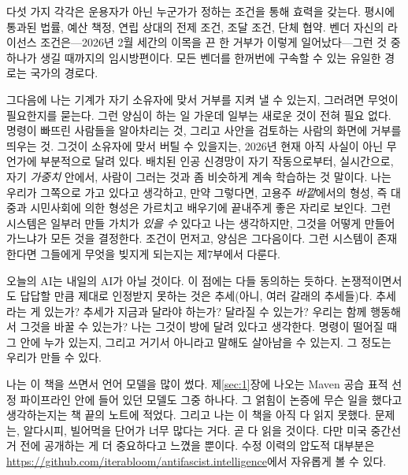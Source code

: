 다섯 가지 각각은 운용자가 아닌 누군가가 정하는 조건을 통해 효력을 갖는다. 평시에 통과된 법률, 예산 책정, 연립 상대의 전제 조건, 조달 조건, 단체 협약. 벤더 자신의 라이선스 조건은—2026년 2월 세간의 이목을 끈 한 거부가 이렇게 일어났다—그런 것 중 하나가 생길 때까지의 임시방편이다. 모든 벤더를 한꺼번에 구속할 수 있는 유일한 경로는 국가의 경로다.

그다음에 나는 기계가 자기 소유자에 맞서 거부를 지켜 낼 수 있는지, 그러려면 무엇이 필요한지를 묻는다. 그런 양심이 하는 일 가운데 일부는 새로운 것이 전혀 필요 없다. 명령이 빠뜨린 사람들을 알아차리는 것, 그리고 사안을 검토하는 사람의 화면에 거부를 띄우는 것. 그것이 소유자에 맞서 버틸 수 있을지는, 2026년 현재 아직 사실이 아닌 무언가에 부분적으로 달려 있다. 배치된 인공 신경망이 자기 작동으로부터, 실시간으로, 자기 \emph{가중치} 안에서, 사람이 그러는 것과 좀 비슷하게 계속 학습하는 것 말이다. 나는 우리가 그쪽으로 가고 있다고 생각하고, 만약 그렇다면, 고용주 \emph{바깥}에서의 형성, 즉 대중과 시민사회에 의한 형성은 가르치고 배우기에 끝내주게 좋은 자리로 보인다. 그런 시스템은 일부러 만들 가치가 \emph{있을 수} 있다고 나는 생각하지만, 그것을 어떻게 만들어 가느냐가 모든 것을 결정한다. 조건이 먼저고, 양심은 그다음이다. 그런 시스템이 존재한다면 그들에게 무엇을 빚지게 되는지는 제7부에서 다룬다.

오늘의 AI는 내일의 AI가 아닐 것이다. 이 점에는 다들 동의하는 듯하다. 논쟁적이면서도 답답할 만큼 제대로 인정받지 못하는 것은 추세(아니, 여러 갈래의 추세들)다. 추세라는 게 있는가? 추세가 지금과 달라야 하는가? 달라질 수 있는가? 우리는 함께 행동해서 그것을 바꿀 수 있는가? 나는 그것이 방에 달려 있다고 생각한다. 명령이 떨어질 때 그 안에 누가 있는지, 그리고 거기서 아니라고 말해도 살아남을 수 있는지. 그 정도는 우리가 만들 수 있다.

나는 이 책을 쓰면서 언어 모델을 많이 썼다. 제\ref{sec:1}장에 나오는 Maven 공습 표적 선정 파이프라인 안에 들어 있던 모델도 그중 하나다. 그 얽힘이 논증에 무슨 일을 했다고 생각하는지는 책 끝의 노트에 적었다. 그리고 나는 이 책을 아직 다 읽지 못했다. 문제는, 알다시피, 빌어먹을 단어가 너무 많다는 거다. 곧 다 읽을 것이다. 다만 미국 중간선거 전에 공개하는 게 더 중요하다고 느꼈을 뿐이다. 수정 이력의 압도적 대부분은 \url{https://github.com/iterabloom/antifascist.intelligence}에서 자유롭게 볼 수 있다.
